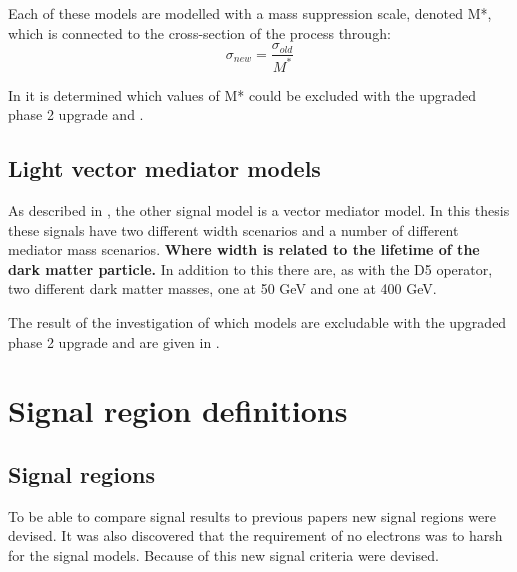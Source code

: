 Each of these models are modelled with a mass suppression scale, denoted M*, which is connected to the cross-section of the process through:
\begin{equation}
\sigma_{new} = \frac{\sigma_{old}}{M^*} 
\end{equation}

In  it is determined which values of M* could be excluded with the upgraded \abbrLHC phase 2 upgrade and \abbrATLAS .

\subsection{Light vector mediator models}
As described in , the other signal model is a vector mediator model. In this thesis these signals have two different width scenarios and a number of different mediator mass scenarios. \textbf{Where width is related to the lifetime of the dark matter particle.} In addition to this there are, as with the D5 operator, two different dark matter masses, one at 50 GeV and one at 400 GeV.

The result of the investigation of which models are excludable with the upgraded \abbrLHC phase 2 upgrade and \abbrATLAS are given in . 
 
\newpage
\section{Signal region definitions}
\subsection{Signal regions}
To be able to compare signal results to previous papers new signal regions were devised. It was also discovered that the requirement of no electrons was to harsh for the signal models. Because of this new signal criteria were devised.


